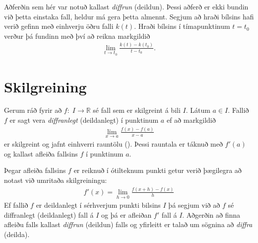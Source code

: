 \documentclass[a4paper,10pt,icelandic]{sphinxmanual}
\begin{document}
Aðferðin sem hér var notuð kallast  \textit{diffrun} (deildun).
Þessi aðferð er ekki bundin við þetta einstaka fall, heldur má gera þetta almennt. Segjum að hraði bílsins hafi verið gefinn með einhverju öðru falli \(k(t)\).
Hraði bílsins í tímapunktinum \(t=t_0\) verður þá fundinn með því að reikna markgildið
\begin{equation*}
\begin{split}\lim_{t\to t_0}\frac{k(t)-k(t_0)}{t-t_0}.\end{split}
\end{equation*}

\section{Skilgreining}
\label{\detokenize{Kafli11:skilgreining}}
Gerum ráð fyrir að \(f:\;I\to \mathbb{R}\) sé fall sem er skilgreint á bili \(I\).
Látum \(a\in I\).
Fallið \(f\) er sagt vera \textit{diffranlegt} (deildanlegt) í punktinum \(a\) ef að markgildið
\begin{equation*}
\begin{split}\lim_{x\to a}\frac{f(x)-f(a)}{x-a}\end{split}
\end{equation*}
er skilgreint og jafnt einhverri rauntölu ().
Þessi rauntala er táknuð með \(f'(a)\) og kallast afleiða fallsins \(f\) í punktinum \(a\).

Þegar afleiða fallsins \(f\) er reiknuð í ótilteknum punkti getur verið þægilegra að notast við umritaða skilgreiningu:
\begin{equation*}
\begin{split}f'(x)=\lim_{h\to 0}\frac{f(x+h)-f(x)}{h}\end{split}
\end{equation*}
Ef fallið \(f\) er deildanlegt í sérhverjum punkti bilsins \(I\) þá segjum við að \(f\) sé diffranlegt (deildanlegt) fall á \(I\) og þá er afleiðan \(f'\) fall á \(I\).
Aðgerðin að finna afleiðu falls kallast \textit{diffrun} (deildun) falls og yfirleitt er talað um sögnina að \textit{diffra} (deilda).
\end{document}
